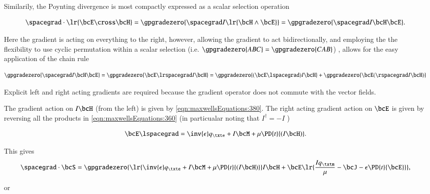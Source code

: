 Similarily, the Poynting divergence is most compactly expressed as a scalar selection operation

\begin{equation}\label{eqn:maxwellsEquations:640}
\spacegrad \cdot \lr{ \bcE \cross \bcH }
=
\gpgradezero{ \spacegrad I \lr{ \bcH \wedge \bcE } }
=
\gpgradezero{ \spacegrad I \bcH \bcE }.
\end{equation}

Here the gradient is acting on everything to the right, however, allowing the gradient to act bidirectionally, and employing the
the flexibility to use cyclic permutation within a scalar selection
(i.e. \(\gpgradezero{ABC} = \gpgradezero{CAB}\))
, allows for the easy application of the chain rule

\begin{dmath}\label{eqn:maxwellsEquations:760}
\gpgradezero{ \spacegrad I \bcH \bcE }
=
\gpgradezero{ \bcE \lrspacegrad I \bcH }
=
\gpgradezero{ (\bcE \lspacegrad) I \bcH }
+\gpgradezero{ \bcE (\rspacegrad I \bcH) }
\end{dmath}

Explicit left and right acting gradients are required because the gradient operator does not commute with the vector fields.

The gradient action on \( I \bcH \) (from the left) is given by
\cref{eqn:maxwellsEquations:380}.  The right acting gradient action on \( \bcE \) is given by reversing all the products in
\cref{eqn:maxwellsEquations:360} (in particualar noting that \( I^\dagger = -I \) )

\begin{dmath}\label{eqn:maxwellsEquations:660}
\bcE \lspacegrad = \inv{\epsilon} q_\txte + I \bcM + \mu \PD{t}{(I\bcH)}.
\end{dmath}

This gives
\begin{dmath}\label{eqn:maxwellsEquations:680}
\spacegrad \cdot \bcS
=
\gpgradezero
{
\lr{ \inv{\epsilon} q_\txte + I \bcM + \mu \PD{t}{(I\bcH)} } I \bcH
+
\bcE
\lr
{
\frac{I q_\txtm}{\mu} - \bcJ - \epsilon \PD{t}{\bcE}
}
}
,
\end{dmath}

or

